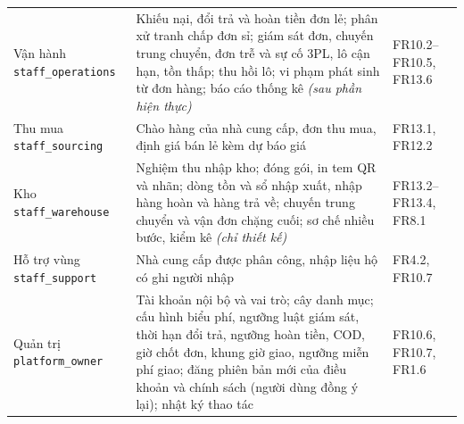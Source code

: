 \begin{longtable}{L{3.90cm} L{7.74cm} L{3.25cm}}
Vận hành \newline\texttt{staff\_operations} & Khiếu nại, đổi trả và hoàn tiền đơn lẻ; phân xử tranh chấp đơn sỉ; giám sát đơn, chuyến trung chuyển, đơn trễ và sự cố 3PL, lô cận hạn, tồn thấp; thu hồi lô; vi phạm phát sinh từ đơn hàng; báo cáo thống kê \emph{(sau phần hiện thực)} & FR10.2--FR10.5, FR13.6 \\
Thu mua \newline\texttt{staff\_sourcing} & Chào hàng của nhà cung cấp, đơn thu mua, định giá bán lẻ kèm dự báo giá & FR13.1, FR12.2 \\
Kho \newline\texttt{staff\_warehouse} & Nghiệm thu nhập kho; đóng gói, in tem QR và nhãn; dòng tồn và sổ nhập xuất, nhập hàng hoàn và hàng trả về; chuyến trung chuyển và vận đơn chặng cuối; sơ chế nhiều bước, kiểm kê \emph{(chỉ thiết kế)} & FR13.2--FR13.4, FR8.1 \\
Hỗ trợ vùng \newline\texttt{staff\_support} & Nhà cung cấp được phân công, nhập liệu hộ có ghi người nhập & FR4.2, FR10.7 \\
Quản trị \newline\texttt{platform\_owner} & Tài khoản nội bộ và vai trò; cây danh mục; cấu hình biểu phí, ngưỡng luật giám sát, thời hạn đổi trả, ngưỡng hoàn tiền, COD, giờ chốt đơn, khung giờ giao, ngưỡng miễn phí giao; đăng phiên bản mới của điều khoản và chính sách (người dùng đồng ý lại); nhật ký thao tác & FR10.6, FR10.7, FR1.6 \\
\end{longtable}
\endgroup
